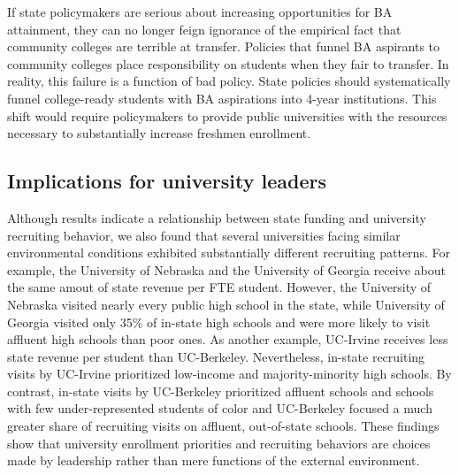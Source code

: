 \documentclass[twoside]{article}
\begin{document}
If state policymakers are serious about increasing opportunities for BA attainment, they can no longer feign ignorance of the empirical fact that community colleges are terrible at transfer.  Policies that funnel BA aspirants to community colleges place responsibility on students when they fair to transfer. In reality, this failure is a function of bad policy. State policies should systematically funnel college-ready students with BA aspirations into 4-year institutions.  This shift would require policymakers to provide public universities with the resources necessary to substantially increase freshmen enrollment.

\subsection*{Implications for university leaders}

Although results indicate a relationship between state funding and university recruiting behavior, we also found that several universities facing similar environmental conditions exhibited substantially different recruiting patterns. For example, the University of Nebraska and the University of Georgia receive about the same amout of state revenue per FTE student. However, the University of Nebraska visited nearly every public high school in the state, while University of Georgia visited only 35\% of in-state high schools and were more likely to visit affluent high schools than poor ones. As another example, UC-Irvine receives less state revenue per student than UC-Berkeley. Nevertheless, in-state recruiting visits by UC-Irvine prioritized low-income and majority-minority high schools. By contrast, in-state visits by UC-Berkeley prioritized affluent schools and schools with few under-represented students of color and UC-Berkeley focused a much greater share of recruiting visits on affluent, out-of-state schools.  These findings show that university enrollment priorities and recruiting behaviors are choices made by leadership rather than mere functions of the external environment. 
\end{document}
